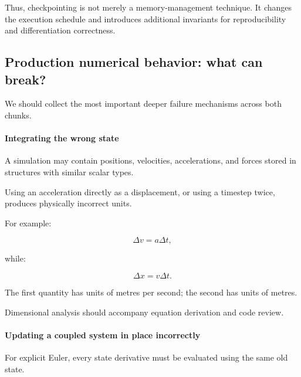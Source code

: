 Thus, checkpointing is not merely a memory-management technique. It changes the execution schedule and introduces additional invariants for reproducibility and differentiation correctness.

\subsection{Production numerical behavior: what can break?}\label{02-foundations-ii-ch022-production-numerical-behavior-what-can-break}

\hypertarget{02-foundations-ii-ch022-production-numerical-behavior-what-can-break}{}

We should collect the most important deeper failure mechanisms across both chunks.

\paragraph{Integrating the wrong state}\label{02-foundations-ii-ch022-integrating-the-wrong-state}

\hypertarget{02-foundations-ii-ch022-integrating-the-wrong-state}{}

A simulation may contain positions, velocities, accelerations, and forces stored in structures with similar scalar types.

Using an acceleration directly as a displacement, or using a timestep twice, produces physically incorrect units.

For example:

\[
\Delta v=a\Delta t,
\]

while:

\[
\Delta x=v\Delta t.
\]

The first quantity has units of metres per second; the second has units of metres.

Dimensional analysis should accompany equation derivation and code review.

\paragraph{Updating a coupled system in place incorrectly}\label{02-foundations-ii-ch022-updating-a-coupled-system-in-place-incorrectly}

\hypertarget{02-foundations-ii-ch022-updating-a-coupled-system-in-place-incorrectly}{}

For explicit Euler, every state derivative must be evaluated using the same old state.

